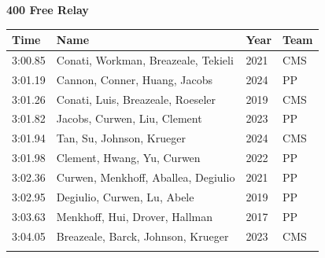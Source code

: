 \vspace{1.2em}
\noindent\begin{minipage}[t]{0.98\textwidth}
\centering
\textbf{\textcolor{teamprimary}{400 Free Relay}}\par
\vspace{0.5em}
\centering
\small
\renewcommand{\arraystretch}{1.0}
\setlength{\tabcolsep}{4pt}
\begin{tabular}{@{}p{2.7cm}p{4.3cm}p{1.6cm}p{2.7cm}@{}}
\toprule
\textbf{Time} & \textbf{Name} & \textbf{Year} & \textbf{Team} \\
\midrule
3:00.85 & Conati, Workman, Breazeale, Tekieli & 2021 & CMS \\
3:01.19 & Cannon, Conner, Huang, Jacobs & 2024 & PP \\
3:01.26 & Conati, Luis, Breazeale, Roeseler & 2019 & CMS \\
3:01.82 & Jacobs, Curwen, Liu, Clement & 2023 & PP \\
3:01.94 & Tan, Su, Johnson, Krueger & 2024 & CMS \\
3:01.98 & Clement, Hwang, Yu, Curwen & 2022 & PP \\
3:02.36 & Curwen, Menkhoff, Aballea, Degiulio & 2021 & PP \\
3:02.95 & Degiulio, Curwen, Lu, Abele & 2019 & PP \\
3:03.63 & Menkhoff, Hui, Drover, Hallman & 2017 & PP \\
3:04.05 & Breazeale, Barck, Johnson, Krueger & 2023 & CMS \\
\bottomrule
\vspace{0.5em}
\end{tabular}
\end{minipage}
\vspace{1.2em}
